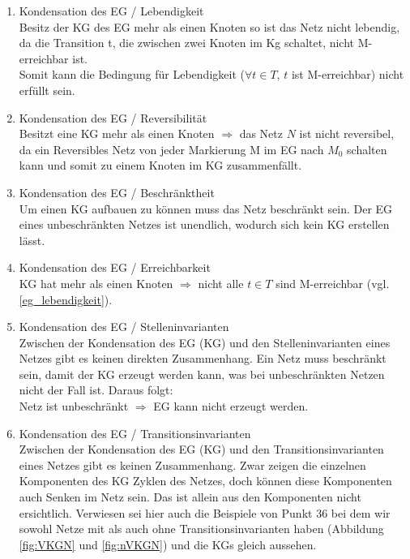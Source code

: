 \documentclass[10pt]{scrartcl}
\begin{document}
\begin{enumerate}
\item{Kondensation des EG / Lebendigkeit}\\
\label{eg_lebendigkeit}
Besitz der KG des EG mehr als einen Knoten so ist das Netz nicht lebendig, da die Transition t, die zwischen zwei Knoten im Kg schaltet, nicht M-erreichbar ist.\\
Somit kann die Bedingung für Lebendigkeit ($\forall t \in T$, $t$ ist M-erreichbar) nicht erfüllt sein.

\item{Kondensation des EG  / Reversibilität}\\
Besitzt eine KG mehr als einen Knoten $\Rightarrow$ das Netz $N$ ist nicht reversibel, da ein Reversibles Netz von jeder Markierung M im EG nach $M_{0}$ schalten kann und somit zu einem Knoten im KG zusammenfällt. 

\item{Kondensation des EG  / Beschränktheit}\\
Um einen KG aufbauen zu können muss das Netz beschränkt sein. 
Der EG eines unbeschränkten Netzes ist unendlich, wodurch sich kein KG erstellen lässt. 

\item{Kondensation des EG  / Erreichbarkeit}\\
KG hat mehr als einen Knoten $\Rightarrow$ nicht alle $t \in T$ sind M-erreichbar (vgl. \ref{eg_lebendigkeit}).

\item{Kondensation des EG  / Stelleninvarianten}\\
Zwischen der Kondensation des EG (KG) und den Stelleninvarianten eines Netzes gibt es keinen direkten Zusammenhang. 
Ein Netz muss beschränkt sein, damit der KG erzeugt werden kann, was bei unbeschränkten Netzen nicht der Fall ist. Daraus folgt:\\
Netz ist unbeschränkt $\Rightarrow$ EG kann nicht erzeugt werden.

\item{Kondensation des EG  / Transitionsinvarianten}\\
Zwischen der Kondensation des EG (KG) und den Transitionsinvarianten eines Netzes gibt es keinen Zusammenhang. Zwar zeigen die einzelnen Komponenten des KG Zyklen des Netzes, doch können diese Komponenten auch Senken im Netz sein. Das ist allein aus den Komponenten nicht ersichtlich. Verwiesen sei hier auch die Beispiele von Punkt 36 bei dem wir sowohl Netze mit als auch ohne Transitionsinvarianten haben (Abbildung \ref{fig:VKGN} und \ref{fig:nVKGN}) und die KGs gleich aussehen.


\end{enumerate}
\end{document}
